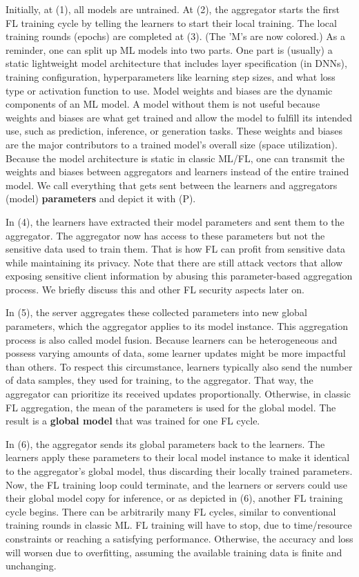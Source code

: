 Initially, at (1), all models are untrained.
At (2), the aggregator starts the first FL training cycle by telling the learners
to start their local training.
The local training rounds (epochs) are completed at (3).
(The 'M's are now colored.)
As a reminder, one can split up ML models into two parts.
One part is (usually) a static lightweight model architecture
that includes layer specification (in DNNs), training configuration,
hyperparameters like learning step sizes, and what loss type or
activation function to use.
Model weights and biases are the dynamic components of an ML model.
A model without them is not useful because weights and biases
are what get trained and allow the model to fulfill its intended use,
such as prediction, inference, or generation tasks.
These weights and biases are the major contributors to
a trained model's overall size (space utilization).
Because the model architecture is static in classic ML/FL,
one can transmit the weights and biases between aggregators and learners
instead of the entire trained model.
We call everything that gets sent between the learners and aggregators
(model) \textbf{parameters} and depict it with (P).

In (4), the learners have extracted their model parameters and sent them to the aggregator.
The aggregator now has access to these parameters but not
the sensitive data used to train them.
That is how FL can profit from sensitive data while maintaining its privacy.
Note that there are still attack vectors that allow exposing sensitive client information
by abusing this parameter-based aggregation process.
We briefly discuss this and other FL security aspects later on.

In (5), the server aggregates these collected parameters into
new global parameters, which the aggregator applies to its model instance.
This aggregation process is also called model fusion.
Because learners can be heterogeneous and possess varying amounts of data,
some learner updates might be more impactful than others.
To respect this circumstance, learners typically also send the number
of data samples, they used for training, to the aggregator.
That way, the aggregator can prioritize its received updates proportionally.
Otherwise, in classic FL aggregation, the mean of the parameters is used for the global model.
The result is a \textbf{global model} that was trained for one FL cycle.

In (6), the aggregator sends its global parameters back to the learners.
The learners apply these parameters to their local model instance
to make it identical to the aggregator's global model,
thus discarding their locally trained parameters.
Now, the FL training loop could terminate, and the learners or servers
could use their global model copy for inference, or
as depicted in (6), another FL training cycle begins.
There can be arbitrarily many FL cycles, similar to conventional training rounds
in classic ML. FL training will have to stop,
due to time/resource constraints or reaching a satisfying performance.
Otherwise, the accuracy and loss will worsen due to overfitting,
assuming the available training data is finite and unchanging.

